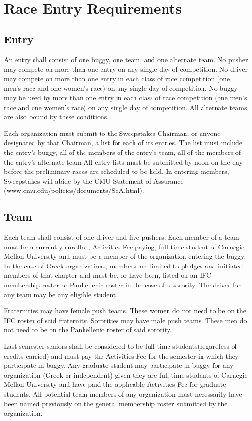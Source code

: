 \documentclass[openany]{book}
\begin{document}
\section{Race Entry Requirements}

\subsection{Entry}
An entry shall consist of one buggy, one team, and one alternate team. No pusher may compete on more than one entry on any single day of competition. No driver may compete on more than one entry in each class of race competition (one men's race and one women's race) on any single day of competition. No buggy may be used by more than one entry in each class of race competition (one men's race and one women's race) on any single day of competition. All alternate teams are also bound by these conditions.

Each organization must submit to the Sweepstakes Chairman, or anyone designated by that Chairman, a list for each of its entries. The list must include the entry's buggy, all of the members of the entry's team, all of the members of the entry's alternate team All entry lists must be submitted by noon on the day before the preliminary races are scheduled to be held.  In entering members, Sweepstakes will abide by the CMU Statement of Assurance (www.cmu.edu/policies/documents/SoA.html).

\subsection{Team}
Each team shall consist of one driver and five pushers. Each member of a team must be a currently enrolled, Activities Fee paying, full-time student of Carnegie Mellon University and must be a member of the organization entering the buggy. In the case of Greek organizations, members are limited to pledges and initiated members of that chapter and must be, or have been, listed on an IFC membership roster or Panhellenic roster in the case of a sorority. The driver for any team may be any eligible student.

Fraternities may have female push teams. These women do not need to be on the IFC roster of said fraternity. Sororities may have male push teams. These men do not need to be on the Panhellenic roster of said sorority.

Last semester seniors shall be considered to be full-time students(regardless of credits carried) and must pay the Activities Fee for the semester in which they participate in buggy. Any graduate student may participate in buggy for any organization (Greek or independent) given they are full-time students of Carnegie Mellon University and have paid the applicable Activities Fee for graduate students. All potential team members of any organization must necessarily have been named previously on the general membership roster submitted by the organization.
\end{document}
